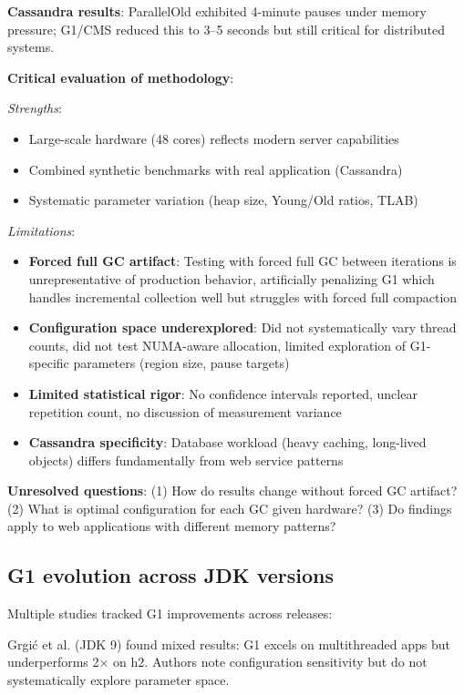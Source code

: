 \textbf{Cassandra results}: ParallelOld exhibited 4-minute pauses under memory pressure; G1/CMS reduced this to 3--5 seconds but still critical for distributed systems.

\textbf{Critical evaluation of methodology}:

\textit{Strengths}:
\begin{itemize}
    \item Large-scale hardware (48 cores) reflects modern server capabilities
    \item Combined synthetic benchmarks with real application (Cassandra)
    \item Systematic parameter variation (heap size, Young/Old ratios, TLAB)
\end{itemize}

\textit{Limitations}:
\begin{itemize}
    \item \textbf{Forced full GC artifact}: Testing with forced full GC between iterations is unrepresentative of production behavior, artificially penalizing G1 which handles incremental collection well but struggles with forced full compaction
    \item \textbf{Configuration space underexplored}: Did not systematically vary thread counts, did not test NUMA-aware allocation, limited exploration of G1-specific parameters (region size, pause targets)
    \item \textbf{Limited statistical rigor}: No confidence intervals reported, unclear repetition count, no discussion of measurement variance
    \item \textbf{Cassandra specificity}: Database workload (heavy caching, long-lived objects) differs fundamentally from web service patterns
\end{itemize}

\textbf{Unresolved questions}: (1) How do results change without forced GC artifact? (2) What is optimal configuration for each GC given hardware? (3) Do findings apply to web applications with different memory patterns?

\subsection{G1 evolution across JDK versions}
\label{subsec:g1-evolution}

Multiple studies tracked G1 improvements across releases:

Grgić et al. \cite{grgic2018comparison} (JDK 9) found mixed results: G1 excels on multithreaded apps but underperforms 2× on h2. Authors note configuration sensitivity but do not systematically explore parameter space.

